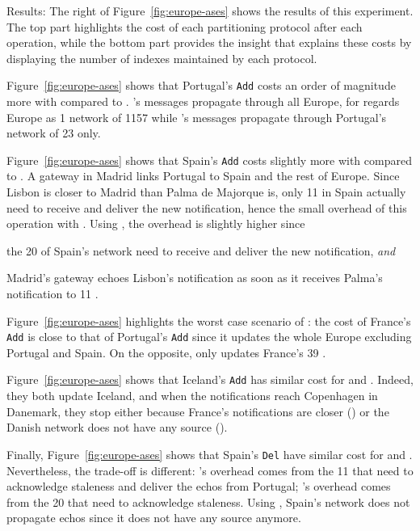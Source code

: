 \begin{asparadesc}
  \item[Results:] The right of Figure~\ref{fig:europe-ases} shows the
    results of this experiment. The top part highlights the cost of
    each partitioning protocol after each operation, while the bottom
    part provides the insight that explains these costs by displaying
    the number of indexes maintained by each protocol.

    \noindent Figure~\ref{fig:europe-ases} shows that Portugal's
    \texttt{Add} costs an order of magnitude more with \NAME compared
    to \NAMEC.  \NAME's messages propagate through all Europe, for
    \NAME regards Europe as 1 network of 1157 \processes while
    \NAMEC's messages propagate through Portugal's network of 23
    \processes only.

    \noindent Figure~\ref{fig:europe-ases} shows that Spain's
    \texttt{Add} costs slightly more with \NAMEC compared to \NAME.  A
    gateway in Madrid links Portugal to Spain and the rest of
    Europe. Since Lisbon is closer to Madrid than Palma de Majorque
    is, only 11 \processes in Spain actually need to receive and
    deliver the new notification, hence the small overhead of this
    operation with \NAME. Using \NAMEC, the overhead is slightly
    higher since
    \begin{inparaenum}[(i)]
    \item the 20 \processes of Spain's network need to receive and
      deliver the new notification, \emph{and}
    \item Madrid's gateway echoes Lisbon's notification as soon as it
      receives Palma's notification to 11 \processes.
    \end{inparaenum}

    \noindent Figure~\ref{fig:europe-ases} highlights the worst
    case scenario of \NAME: the cost of France's \texttt{Add} is close
    to that of Portugal's \texttt{Add} since it updates the whole
    Europe excluding Portugal and Spain. On the opposite, \NAMEC only
    updates France's 39 \processes.

    \noindent Figure~\ref{fig:europe-ases} shows that Iceland's
    \texttt{Add} has similar cost for \NAME and \NAMEC. Indeed, they
    both update Iceland, and when the notifications reach Copenhagen
    in Danemark, they stop either because France's notifications are
    closer (\NAME) or the Danish network does not have any source
    (\NAMEC).

    \noindent Finally, Figure~\ref{fig:europe-ases} shows that
    Spain's \texttt{Del} have similar cost for \NAME and
    \NAMEC. Nevertheless, the trade-off is different: \NAME's overhead
    comes from the 11 \nodes that need to acknowledge staleness and
    deliver the echos from Portugal; \NAMEC's overhead comes from the
    20 \nodes that need to acknowledge staleness. Using \NAMEC,
    Spain's network does not propagate echos since it does not have
    any source anymore.

\end{asparadesc}

